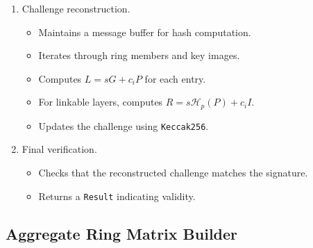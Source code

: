 \documentclass[12pt,a4paper]{article}
\begin{document}
\begin{description}
\begin{enumerate}
\item Challenge reconstruction.
  \begin{itemize}
  \item Maintains a message buffer for hash computation. %
  \item Iterates through ring members and key images. %
  \item Computes $L = sG + c_i P$ for each entry. %
  \item For linkable layers, computes $R = s \mathcal{H}_p(P) + c_i I$. %
  \item Updates the challenge using \texttt{Keccak256}. %
  \end{itemize}

\item Final verification.
  \begin{itemize}
  \item Checks that the reconstructed challenge matches the signature. %
  \item Returns a \texttt{Result} indicating validity.
  \end{itemize}
\end{enumerate}
\end{description}

\subsection{Aggregate Ring Matrix Builder}
\end{document}
